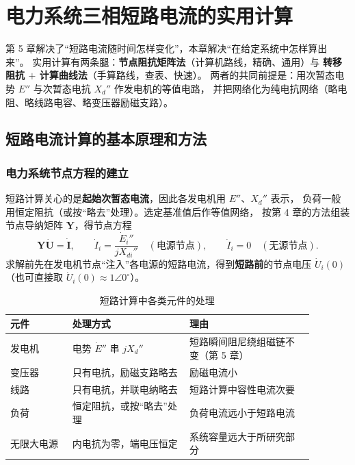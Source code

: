 
\chapter{电力系统三相短路电流的实用计算}

第 5 章解决了“短路电流随时间怎样变化”，本章解决“在给定系统中怎样算出来”。
实用计算有两条腿：\textbf{节点阻抗矩阵法}（计算机路线，精确、通用）与
\textbf{转移阻抗 $+$ 计算曲线法}（手算路线，查表、快速）。
两者的共同前提是：用次暂态电势 $E''$ 与次暂态电抗 $X_d''$ 作发电机的等值电路，
并把网络化为纯电抗网络（略电阻、略线路电容、略变压器励磁支路）。

\section{短路电流计算的基本原理和方法}

\subsection{电力系统节点方程的建立}

短路计算关心的是\textbf{起始次暂态电流}，因此各发电机用 $E''$、$X_d''$ 表示，
负荷一般用恒定阻抗（或按“略去”处理）。选定基准值后作等值网络，
按第 4 章的方法组装节点导纳矩阵 $\boldsymbol Y$，得节点方程
\begin{equation}
  \boldsymbol Y\dot{\boldsymbol U}=\dot{\boldsymbol I},
  \qquad \dot I_i=\frac{\dot E_i''}{jX_{di}''}\quad(\text{电源节点}),
  \qquad \dot I_i=0\quad(\text{无源节点}).
\end{equation}
求解前先在发电机节点“注入”各电源的短路电流，得到\textbf{短路前}的节点电压
$\dot U_i(0)$（也可直接取 $\dot U_i(0)\approx1\angle0^\circ$）。

\begin{table}[htbp]
  \centering
  \caption{短路计算中各类元件的处理}
  \small
  \begin{tabular}{@{}p{0.18\linewidth}p{0.34\linewidth}p{0.36\linewidth}@{}}
    \toprule
    元件 & 处理方式 & 理由 \\
    \midrule
    发电机 & 电势 $\dot E''$ 串 $jX_d''$ & 短路瞬间阻尼绕组磁链不变（第 5 章） \\
    变压器 & 只有电抗，励磁支路略去 & 励磁电流小 \\
    线路 & 只有电抗，并联电纳略去 & 短路计算中容性电流次要 \\
    负荷 & 恒定阻抗，或按“略去”处理 & 负荷电流远小于短路电流 \\
    无限大电源 & 内电抗为零，端电压恒定 & 系统容量远大于所研究部分 \\
    \bottomrule
  \end{tabular}
\end{table}

